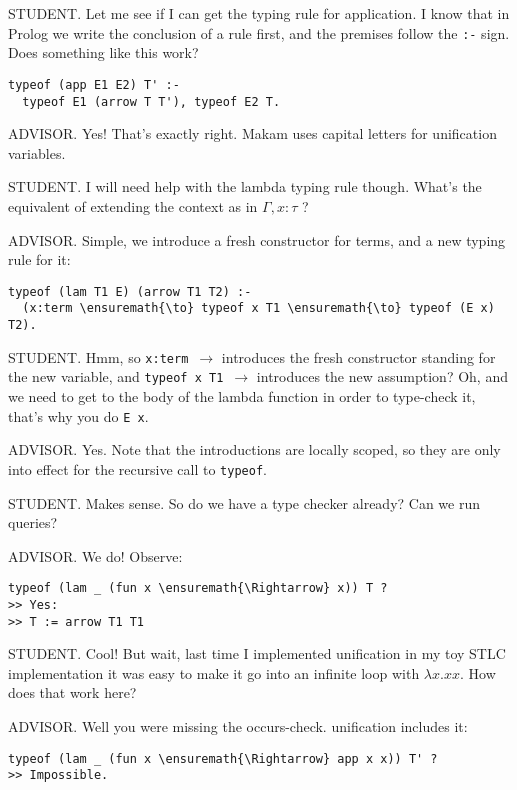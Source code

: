 STUDENT. Let me see if I can get the typing rule for application. I know
that in Prolog we write the conclusion of a rule first, and the premises
follow the \texttt{:-} sign. Does something like this work?

\begin{verbatim}
typeof (app E1 E2) T' :-
  typeof E1 (arrow T T'), typeof E2 T.
\end{verbatim}

ADVISOR. Yes! That's exactly right. Makam uses capital letters for
unification variables.

STUDENT. I will need help with the lambda typing rule though. What's the
equivalent of extending the context as in \(\Gamma, x : \tau\) ?

ADVISOR. Simple, we introduce a fresh constructor for terms, and a new
typing rule for it:

\begin{verbatim}
typeof (lam T1 E) (arrow T1 T2) :-
  (x:term \ensuremath{\to} typeof x T1 \ensuremath{\to} typeof (E x) T2).
\end{verbatim}

STUDENT. Hmm, so \texttt{x:term\ \ensuremath{\to}} introduces the fresh
constructor standing for the new variable, and
\texttt{typeof\ x\ T1\ \ensuremath{\to}} introduces the new assumption?
Oh, and we need to get to the body of the lambda function in order to
type-check it, that's why you do \texttt{E\ x}.

ADVISOR. Yes. Note that the introductions are locally scoped, so they
are only into effect for the recursive call to \texttt{typeof}.

STUDENT. Makes sense. So do we have a type checker already? Can we run
queries?

ADVISOR. We do! Observe:

\begin{verbatim}
typeof (lam _ (fun x \ensuremath{\Rightarrow} x)) T ?
>> Yes:
>> T := arrow T1 T1
\end{verbatim}

STUDENT. Cool! But wait, last time I implemented unification in my toy
STLC implementation it was easy to make it go into an infinite loop with
\(\lambda x. x x\). How does that work here?

ADVISOR. Well you were missing the occurs-check. \lamprolog unification
includes it:

\begin{verbatim}
typeof (lam _ (fun x \ensuremath{\Rightarrow} app x x)) T' ?
>> Impossible.
\end{verbatim}


